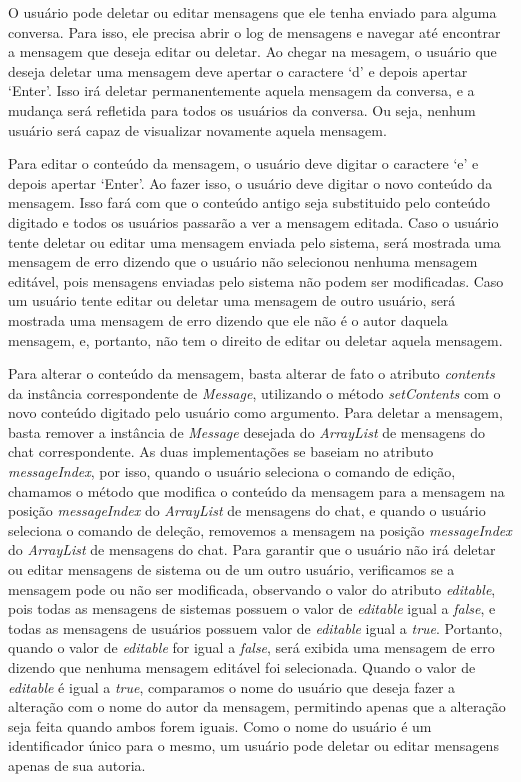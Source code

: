 \documentclass[../main.tex]{subfiles}
\begin{document}
O usuário pode deletar ou editar mensagens que ele tenha enviado para alguma conversa.
Para isso, ele precisa abrir o log de mensagens e navegar até encontrar a mensagem que deseja editar ou deletar.
Ao chegar na mesagem, o usuário que deseja deletar uma mensagem deve apertar o caractere `d' e depois apertar `Enter'.
Isso irá deletar permanentemente aquela mensagem da conversa, e a mudança será refletida para todos os usuários da conversa.
Ou seja, nenhum usuário será capaz de visualizar novamente aquela mensagem.

Para editar o conteúdo da mensagem, o usuário deve digitar o caractere `e' e depois apertar `Enter'.
Ao fazer isso, o usuário deve digitar o novo conteúdo da mensagem.
Isso fará com que o conteúdo antigo seja substituido pelo conteúdo digitado e todos os usuários passarão a ver a mensagem editada.
Caso o usuário tente deletar ou editar uma mensagem enviada pelo sistema, será mostrada uma mensagem de erro dizendo que o usuário não selecionou nenhuma mensagem editável, pois mensagens enviadas pelo sistema não podem ser modificadas.
Caso um usuário tente editar ou deletar uma mensagem de outro usuário, será mostrada uma mensagem de erro dizendo que ele não é o autor daquela mensagem, e, portanto, não tem o direito de editar ou deletar aquela mensagem.

Para alterar o conteúdo da mensagem, basta alterar de fato o atributo \textit{contents} da instância correspondente de \textit{Message}, utilizando o método \textit{setContents} com o novo conteúdo digitado pelo usuário como argumento.
Para deletar a mensagem, basta remover a instância de \textit{Message} desejada do \textit{ArrayList} de mensagens do chat correspondente.
As duas implementações se baseiam no atributo \textit{messageIndex}, por isso, quando o usuário seleciona o comando de edição, chamamos o método que modifica o conteúdo da mensagem para a mensagem na posição \textit{messageIndex} do \textit{ArrayList} de mensagens do chat, e quando o usuário seleciona o comando de deleção, removemos a mensagem na posição \textit{messageIndex} do \textit{ArrayList} de mensagens do chat.
Para garantir que o usuário não irá deletar ou editar mensagens de sistema ou de um outro usuário, verificamos se a mensagem pode ou não ser modificada, observando o valor do atributo \textit{editable}, pois todas as mensagens de sistemas possuem o valor de \textit{editable} igual a \textit{false}, e todas as mensagens de usuários possuem valor de \textit{editable} igual a \textit{true}.
Portanto, quando o valor de \textit{editable} for igual a \textit{false}, será exibida uma mensagem de erro dizendo que nenhuma mensagem editável foi selecionada.
Quando o valor de \textit{editable} é igual a \textit{true}, comparamos o nome do usuário que deseja fazer a alteração com o nome do autor da mensagem, permitindo apenas que a alteração seja feita quando ambos forem iguais.
Como o nome do usuário é um identificador único para o mesmo, um usuário pode deletar ou editar mensagens apenas de sua autoria.
\end{document}
